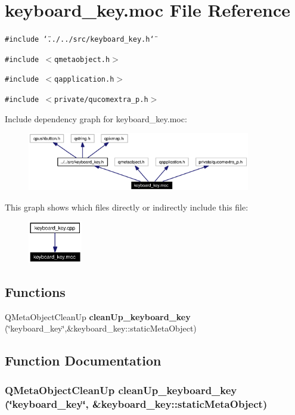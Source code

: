 \section{keyboard\_\-key.moc File Reference}
\label{keyboard__key_8moc}


{\tt \#include \char`\"{}../../src/keyboard\_\-key.h\char`\"{}}\par
{\tt \#include $<$qmetaobject.h$>$}\par
{\tt \#include $<$qapplication.h$>$}\par
{\tt \#include $<$private/qucomextra\_\-p.h$>$}\par


Include dependency graph for keyboard\_\-key.moc:\begin{figure}[H]
\begin{center}
\leavevmode
\includegraphics[width=276pt]{keyboard__key_8moc__incl}
\end{center}
\end{figure}


This graph shows which files directly or indirectly include this file:\begin{figure}[H]
\begin{center}
\leavevmode
\includegraphics[width=67pt]{keyboard__key_8moc__dep__incl}
\end{center}
\end{figure}
\subsection*{Functions}
\begin{CompactItemize}
\item 
QMeta\-Object\-Clean\-Up {\bf clean\-Up\_\-keyboard\_\-key} (\char`\"{}keyboard\_\-key\char`\"{},\&keyboard\_\-key::static\-Meta\-Object)
\end{CompactItemize}


\subsection{Function Documentation}
\subsubsection{\setlength{\rightskip}{0pt plus 5cm}QMeta\-Object\-Clean\-Up clean\-Up\_\-keyboard\_\-key (\char`\"{}keyboard\_\-key\char`\"{}, \&keyboard\_\-key::static\-Meta\-Object)\hspace{0.3cm}{\tt  [static]}}\label{keyboard__key_8moc_a0}


